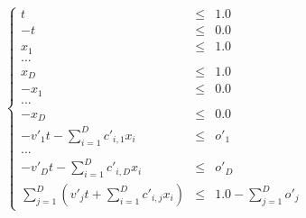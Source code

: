 \documentclass[12pt, a4paper]{article}
\begin{document}
\begin{equation}
\left\lbrace
\begin{array}{rcl}
t&\le&1.0\\
-t&\le&0.0\\
x_1&\le&1.0\\
...\\
x_D&\le&1.0\\
-x_1&\le&0.0\\
...\\
-x_D&\le&0.0\\
-v'_1t-\sum_{i=1}^Dc'_{i,1}x_i&\le&o'_1\\
...\\
-v'_Dt-\sum_{i=1}^Dc'_{i,D}x_i&\le&o'_D\\
\sum_{j=1}^D\left(v'_jt+\sum_{i=1}^Dc'_{i,j}x_i\right)&\le&1.0-\sum_{j=1}^Do'_j
\end{array}
\right.
\end{equation}
\end{document}
